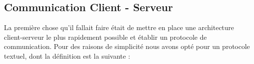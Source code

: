 \subsection{Communication Client - Serveur}

La première chose qu'il fallait faire était de mettre en place une architecture client-serveur le plus rapidement possible et établir un protocole de communication. Pour des raisons de simplicité nous avons opté pour un protocole textuel, dont la définition est la suivante :
